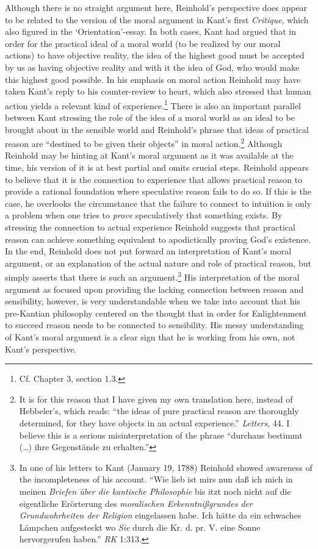 Although there is no straight argument here, Reinhold's perspective does appear to be related to the version of the moral argument in Kant's first \textit{Critique}, which also figured in the `Orientation'{-}essay. In both cases, Kant had argued that in order for the practical ideal of a moral world (to be realized by our moral actions) to have objective reality, the idea of the highest good must be accepted by us as having objective reality and with it the idea of God, who would make this highest good possible. In his emphasis on moral action Reinhold may have taken Kant's reply to his counter{-}review to heart, which also stressed that human action yields a relevant kind of experience.\footnote{ Cf. Chapter 3, section 1.3.} There is also an important parallel between Kant stressing the role of the idea of a moral world as an ideal to be brought about in the sensible world and Reinhold's phrase that ideas of practical reason are ``destined to be given their objects'' in moral action.\footnote{ It is for this reason that I have given my own translation here, instead of Hebbeler's, which reads: ``the ideas of pure practical reason are thoroughly determined, for they have objects in an actual experience.'' \textit{Letters}, 44. I believe this is a serious misinterpretation of the phrase ``durchaus bestimmt (\ldots ) ihre Gegenst\"{a}nde zu erhalten.''} Although Reinhold may be hinting at Kant's moral argument as it was available at the time, his version of it is at best partial and omits crucial steps. Reinhold appears to believe that it is the connection to experience that allows practical reason to provide a rational foundation where speculative reason fails to do so. If this is the case, he overlooks the circumstance that the failure to connect to intuition is only a problem when one tries to \textit{prove} speculatively that something exists. By stressing the connection to actual experience Reinhold suggests that practical reason can achieve something equivalent to apodictically proving God's existence. In the end, Reinhold does not put forward an interpretation of Kant's moral argument, or an explanation of the actual nature and role of practical reason, but simply asserts that there is such an argument.\footnote{ In one of his letters to Kant (January 19, 1788) Reinhold showed awareness of the incompleteness of his account. ``Wie lieb ist mirs nun da\ss{} ich mich in meinen \textit{Briefen \"{u}ber die kantische Philosophie }bis itzt noch nicht auf die eigentliche Er\"{o}rterung des \textit{moralischen Erkenntni\ss{}grundes der Grundwahrheiten der Religion} eingelassen habe. Ich h\"{a}tte da ein schwaches L\"{a}mpchen aufgesteckt wo \textit{Sie} durch die Kr. d. pr. V. eine Sonne hervorgerufen haben.'' \textit{RK} 1:313.} His interpretation of the moral argument as focused upon providing the lacking connection between reason and sensibility, however, is very understandable when we take into account that his pre{-}Kantian philosophy centered on the thought that in order for Enlightenment to succeed reason needs to be connected to sensibility. His messy understanding of Kant's moral argument is a clear sign that he is working from his own, not Kant's perspective. 

